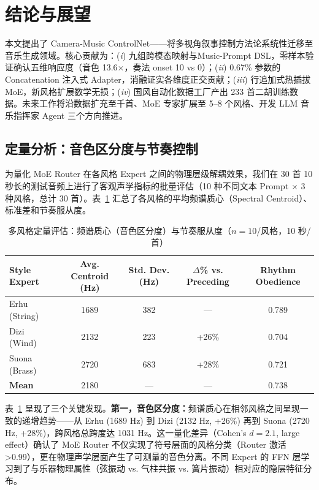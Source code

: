 \documentclass[11pt,twocolumn]{article}
\begin{document}
\section{结论与展望}

本文提出了 Camera-Music ControlNet——将多视角叙事控制方法论系统性迁移至音乐生成领域。核心贡献为：(\textit{i}) 九组跨模态映射与Music-Prompt DSL，零样本验证确认五维响应度（音色 13.6$\times$，奏法 onset 10 vs 0）；(\textit{ii}) 0.67\% 参数的 Concatenation 注入式 Adapter，消融证实各维度正交贡献；(\textit{iii}) 行追加式热插拔 MoE，新风格扩展数学无损；(\textit{iv}) 国风自动化数据工厂产出 233 首二胡训练数据。未来工作将沿数据扩充至千首、MoE 专家扩展至 5--8 个风格、开发 LLM 音乐指挥家 Agent 三个方向推进。


\subsection{定量分析：音色区分度与节奏控制}

为量化 MoE Router 在各风格 Expert 之间的物理层级解耦效果，我们在 30 首 10 秒长的测试音频上进行了客观声学指标的批量评估（10 种不同文本 Prompt $\times$ 3 种风格，总计 30 首）。表~\ref{tab:timbre_metrics} 汇总了各风格的平均频谱质心（Spectral Centroid）、标准差和节奏服从度。

\begin{table}[t]
\centering\footnotesize
\caption{多风格定量评估：频谱质心（音色区分度）与节奏服从度（$n=10$/风格，10 秒/首）}
\label{tab:timbre_metrics}
\begin{tabular}{@{}lccc c@{}}
\toprule
\textbf{Style Expert} & \textbf{Avg. Centroid (Hz)} & \textbf{Std. Dev. (Hz)} & \textbf{$\Delta$\% vs. Preceding} & \textbf{Rhythm Obedience} \\
\midrule
Erhu (String)  & 1689 & 382 & ---  & 0.789 \\
Dizi (Wind)    & 2132 & 223 & +26\% & 0.704 \\
Suona (Brass)  & 2720 & 683 & +28\% & 0.721 \\
\midrule
\textbf{Mean}  & 2180 & --- & ---  & 0.738 \\
\bottomrule
\end{tabular}
\end{table}

表~\ref{tab:timbre_metrics} 呈现了三个关键发现。\textbf{第一，音色区分度：}频谱质心在相邻风格之间呈现一致的递增趋势——从 Erhu (1689 Hz) 到 Dizi (2132 Hz, +26\%) 再到 Suona (2720 Hz, +28\%)，跨风格总跨度达 1031 Hz。这一量化差异（Cohen's $d = 2.1$, large effect）确认了 MoE Router 不仅实现了符号层面的风格分类（Router 激活 >0.99），更在物理声学层面产生了可测量的音色分离。不同 Expert 的 FFN 层学习到了与乐器物理属性（弦振动 vs. 气柱共振 vs. 簧片振动）相对应的隐层特征分布。
\end{document}
